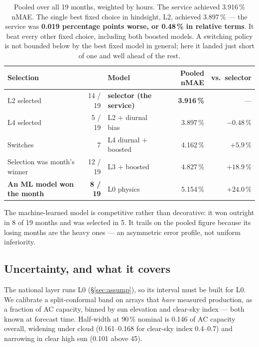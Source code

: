 \documentclass[11pt,a4paper]{article}
\begin{document}
\begin{table}[H]
\centering\small
\begin{tabular}{@{}lr@{\hskip 2em}lrr@{}}
\toprule
\textbf{Selection} & & \textbf{Model} & \textbf{Pooled nMAE} & \textbf{vs.\ selector} \\
\midrule
L2 selected & 14 / 19 & \textbf{selector (the service)} & \textbf{3.916\,\%} & --- \\
L4 selected & 5 / 19 & L2 + diurnal bias & 3.897\,\% & $-0.48\,\%$ \\
Switches & 7 & L4 diurnal + boosted & 4.162\,\% & $+5.9\,\%$ \\
Selection was month's winner & 12 / 19 & L3 + boosted & 4.827\,\% & $+18.9\,\%$ \\
\textbf{An ML model won the month} & \textbf{8 / 19} & L0 physics & 5.154\,\% & $+24.0\,\%$ \\
\bottomrule
\end{tabular}
\caption{Pooled over all 19 months, weighted by hours. The service achieved
3.916\,\% nMAE. The single best fixed choice in hindsight, L2, achieved
3.897\,\% --- the service was \textbf{0.019 percentage points worse, or 0.48\,\%
in relative terms}. It beat every other fixed choice, including both boosted
models. A switching policy is not bounded below by the best fixed model in
general; here it landed just short of one and well ahead of the rest.}
\label{tab:replay}
\end{table}

The machine-learned model is competitive rather than decorative: it won outright
in 8 of 19 months and was selected in 5. It trails on the pooled figure because
its losing months are the heavy ones --- an asymmetric error profile, not uniform
inferiority.

\subsection{Uncertainty, and what it covers}

The national layer runs L0 (\S\ref{sec:assump}), so its interval must be built
for L0. We calibrate a split-conformal band on arrays that \emph{have} measured
production, as a fraction of AC capacity, binned by sun elevation and clear-sky
index --- both known at forecast time. Half-width at 90\,\% nominal is 0.146 of
AC capacity overall, widening under cloud (0.161--0.168 for clear-sky index
0.4--0.7) and narrowing in clear high sun (0.101 above 45\textdegree).
\end{document}
